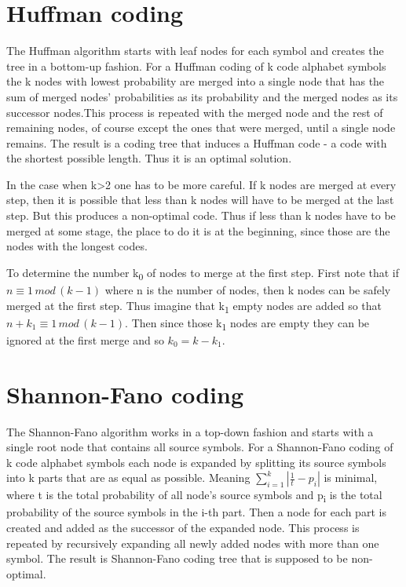 \documentclass{article}
\begin{document}
\section{Huffman coding}
The Huffman algorithm starts with leaf nodes for each symbol and creates the tree in a bottom-up fashion. For a Huffman coding of k code alphabet symbols the k nodes with lowest probability are merged into a single node that has the sum of merged nodes' probabilities as its probability and the merged nodes as its successor nodes.This process is repeated with the merged node and the rest of remaining nodes, of course except the ones that were merged, until a single node remains. The result is a coding tree that induces a Huffman code - a code with the shortest possible length. Thus it is an optimal solution.

In the case when k\textgreater 2 one has to be more careful. If k nodes are merged at every step, then it is possible that less than k nodes will have to be merged at the last step. But this produces a non-optimal code. Thus if less than k nodes have to be merged at some stage, the place to do it is at the beginning, since those are the nodes with the longest codes.

To determine the number k\textsubscript{0}  of nodes to merge at the first step. First note that if $n\equiv 1\,mod\, (k - 1)$ where n is the number of nodes, then k nodes can be safely merged at the first step. Thus imagine that k\textsubscript{1} empty nodes are added so that $n + k_1 \equiv 1\,mod\, (k - 1)$. Then since those k\textsubscript{1} nodes are empty they can be ignored at the first merge and so $k_0 = k - k_1$.

\section{Shannon-Fano coding}
The Shannon-Fano algorithm works in a top-down fashion and starts with a single root node that contains all source symbols. For a Shannon-Fano coding of k code alphabet symbols each node is expanded by splitting its source symbols into k parts that are as equal as possible. Meaning $\sum\limits_{i=1}^k |\frac{1}{t} - p_i|$ is minimal, where t is the total probability of all node's source symbols and p\textsubscript{i} is the total probability of the source symbols in the i-th part. Then a node for each part is created and added as the successor of the expanded node. This process is repeated by recursively expanding all newly added nodes with more than one symbol. The result is Shannon-Fano coding tree that is supposed to be non-optimal.
\end{document}
